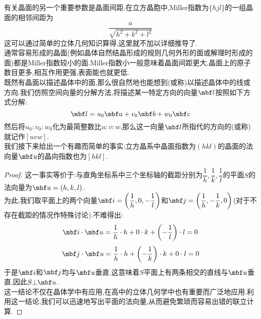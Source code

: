 \documentclass{ctexart}
\begin{document}
有关晶面的另一个重要参数是晶面间距.在立方晶胞中,Miller指数为$\{hjl\}$的一组晶面的相邻间距为
\[\dfrac{a}{\sqrt{h^2+k^2+l^2}}\]
这可以通过简单的立体几何知识算得,这里就不加以详细推导了.\\
\indent 通常容易形成的晶面(例如晶体自然结晶形成的规则几何外形的面或解理时形成的面)都是Miller指数较小的面.Miller指数小一般意味着晶面间距更大,晶面上的原子数目更多,相互作用更强,表面能也就更低.\\
\indent 既然有晶面以描述晶体中的面,那么很自然地也能想到(或称)以描述晶体中的线或方向.我们仿照空间向量的分解方法,将描述某一特定方向的向量$\mbf l$按照如下方式分解:
\[\mbf l=u_0\mbf a+v_0\mbf b+w_0\mbf c\]
然后将$u_0:v_0:w_0$化为最简整数比$u:v:w$,那么这一向量$\mbf l$所指代的方向的(或称)就记作$[uvw]$.\\
\indent 我们接下来给出一个有趣而简单的事实:立方晶系中晶面指数为$(hkl)$的晶面的法向量$\mbf u$的晶向指数也为$[hkl]$.
\begin{proof}
    这一事实等价于:与直角坐标系中三个坐标轴的截距分别为$\dfrac1h,\dfrac1k,\dfrac1l$的平面$S$的法向量为$\mbf u=(h,k,l)$.\\
    为此,我们取平面上的两个向量$\mbf i=\left(\dfrac1h,0,-\dfrac1l\right)$和$\mbf j=\left(\dfrac1h,-\dfrac1k,0\right)$(对于不存在截距的情况作特殊讨论).不难得出:
    \[\mbf i\cdot\mbf u=\dfrac1h\cdot h+0\cdot k+\left(-\dfrac1l\right)\cdot l=0\]
    \[\mbf j\cdot\mbf u=\dfrac1h\cdot h+\left(-\dfrac1k\right)\cdot k+0\cdot l=0\]
    于是$\mbf i$和$\mbf j$均与$\mbf u$垂直.这意味着$S$平面上有两条相交的直线与$\mbf u$垂直,因此$S\bot\mbf u$.\\
    这一结论不仅在晶体学中有应用,在高中的立体几何学中也有重要而广泛地应用.利用这一结论,我们可以迅速地写出平面的法向量,从而避免繁琐而容易出错的联立计算.
\end{proof}
\end{document}
